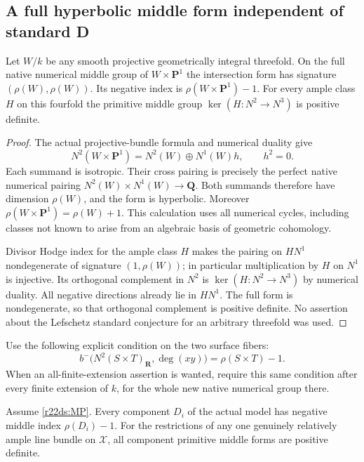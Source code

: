 \subsection{A full hyperbolic middle form independent of standard D}

\begin{lemma}
\label{r22ds:hyperbolic}
Let $W/k$ be any smooth projective geometrically integral threefold.
On the full native numerical middle group of $W\times\mathbf P^1$
the intersection form has signature
$(\rho(W),\rho(W))$.  Its negative index is
$\rho(W\times\mathbf P^1)-1$.  For every ample class $H$ on this
fourfold the primitive middle group
$\ker(H:N^2\to N^3)$ is positive definite.
\end{lemma}

\begin{proof}
The actual projective-bundle formula and numerical duality give
\[
 N^2(W\times\mathbf P^1)
            =N^2(W)\oplus N^1(W)h,
 \qquad h^2=0.
 \tag{DS22.8}\label{r22ds:hyperbolicform}
\]
Each summand is isotropic.  Their cross pairing is precisely the
perfect native numerical pairing $N^2(W)\times N^1(W)\to\mathbf Q$.
Both summands therefore have dimension $\rho(W)$, and the form is
hyperbolic.  Moreover $\rho(W\times\mathbf P^1)=\rho(W)+1$.
This calculation uses all numerical cycles, including classes not
known to arise from an algebraic basis of geometric cohomology.

Divisor Hodge index for the ample class $H$ makes the pairing on
$HN^1$ nondegenerate of signature $(1,\rho(W))$; in particular
multiplication by $H$ on $N^1$ is injective.  Its orthogonal
complement in $N^2$ is $\ker(H:N^2\to N^3)$ by numerical duality.
All negative directions already lie in $HN^1$.  The full form is
nondegenerate, so that orthogonal complement is positive definite.
No assertion about the Lefschetz standard conjecture for an
arbitrary threefold was used.
\end{proof}

Use the following explicit condition on the two surface fibers:
\[
 b^-\bigl(N^2(S\times T)_{\mathbf R},\deg(xy)\bigr)
                         =\rho(S\times T)-1.
 \tag{DS22.9}\label{r22ds:MP}
\]
When an all-finite-extension assertion is wanted, require this same
condition after every finite extension of $k$, for the whole new
native numerical group there.

\begin{proposition}
\label{r22ds:positivity}
Assume \eqref{r22ds:MP}.  Every component $D_i$ of the actual model
has negative middle index $\rho(D_i)-1$.  For the restrictions of
any one genuinely relatively ample line bundle on $\mathcal X$,
all component primitive middle forms are positive definite.
\end{proposition}

